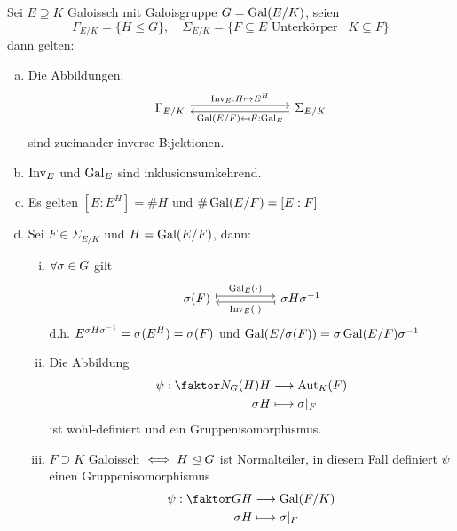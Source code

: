 \documentclass[a4paper]{report}
\begin{document}
\begin{satz}
  Sei $E \supseteq K$ Galoissch mit Galoisgruppe $G = \operatorname{Gal}(E/K)$, seien \[\Gamma_{E/K}=\{H \le G\},\quad \Sigma_{E/K} = \{F \subseteq E \text{ Unterkörper} \mid K \subseteq F\}\]
  dann gelten:
  \begin{enumerate}[(a)]
    \item Die Abbildungen:
          \[\begin{tikzcd}[column sep = 40]
\Gamma_{E/K} \arrow[rr, "\mathrm{Inv}_E:H \mapsto E^H", shift left] &  & \Sigma_{E/K} \arrow[ll, "\mathrm{Gal}(E/F) \mpsfrom F: \mathrm{Gal}_E", shift left]
\end{tikzcd}\]
          sind zueinander inverse Bijektionen.
    \item $\operatorname{Inv}_{E}$ und $\operatorname{Gal}_{E}$ sind inklusionsumkehrend.
    \item Es gelten $[E:E^{H}] = \#H$ und $\#\operatorname{Gal}(E/F) = [E:F]$
    \item Sei $F \in \Sigma_{E/K}$ und $H = \operatorname{Gal}(E/F)$, dann:
          \begin{enumerate}[(i)]
            \item $\forall \sigma \in G$ gilt
                  \[
                  \begin{tikzcd}
\s(F) \arrow[rr, "\mathrm{Gal}_E(\cdot)", maps to, shift left] &  & \s H \s^{-1} \arrow[ll, "\mathrm{Inv}_E(\cdot)", maps to, shift left]
\end{tikzcd}
                  \]
                  d.h. $E^{\sigma H \sigma^{-1}} = \sigma(E^{H}) = \sigma(F)$ und $\operatorname{Gal}(E/\sigma(F)) = \sigma \operatorname{Gal}(E/F)\sigma^{-1}$
            \item Die Abbildung
                  \begin{align*}
                    \psi: \fak{N_{G}(H)}H & \longrightarrow \Aut_{K}(F) \\
                    \s H & \longmapsto \s|_{F}
                  \end{align*}
                  ist wohl-definiert und ein Gruppenisomorphismus.
                  \item $F \supseteq K$ Galoissch $\iff H \trianglelefteq G$ ist Normalteiler, in diesem Fall definiert $\psi$ einen Gruppenisomorphismus
                  \begin{align*}
                    \psi: \fak GH & \longrightarrow \Gal(F/K) \\
                    \s H & \longmapsto \s|_{F}
                  \end{align*}
          \end{enumerate}
  \end{enumerate}
\end{satz}
\end{document}
